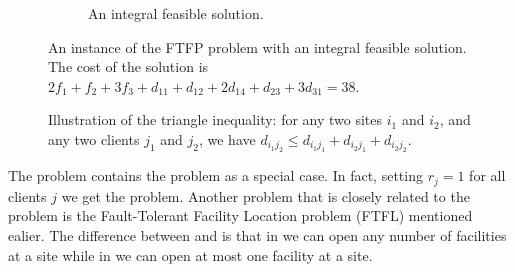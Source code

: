 \documentclass[oneside,final]{ucr}
\def\dsp{\def\baselinestretch{2.0}\large\normalsize}
\def\ssp{\def\baselinestretch{1.0}\large\normalsize}
\begin{document}
\begin{figure}[ht]
\begin{subfigure}[b]{.45\textwidth}
  \caption{An integral feasible solution.}
  \end{subfigure}
  \caption{An instance of the FTFP problem with an integral
    feasible solution. The cost of the solution is $2f_1 +
    f_2 + 3f_3 + d_{11} + d_{12} + 2d_{14} + d_{23} +
    3d_{31} = 38$.}
  \label{fig:ftfp_example}
\end{figure}
\dsp
\ssp
\begin{figure}[ht]
  \centering
  \caption{Illustration of the triangle inequality: for any two sites $i_1$ and $i_2$, and any two clients $j_1$ and $j_2$, we have $d_{i_1 j_2} \leq d_{i_1 j_1} + d_{i_2 j_1} + d_{i_2 j_2}$.}
  \label{fig:triangle}
\end{figure}
\dsp

The {\FTFP} problem contains the {\UFL} problem as a special
case. In fact, setting $r_j = 1$ for all clients $j$ we get
the {\UFL} problem. Another problem that is closely related
to the {\FTFP} problem is the Fault-Tolerant Facility
Location problem (FTFL) mentioned ealier. The difference
between {\FTFP} and {\FTFL} is that in {\FTFP} we can open
any number of facilities at a site while in {\FTFL} we can
open at most one facility at a site.
\end{document}
